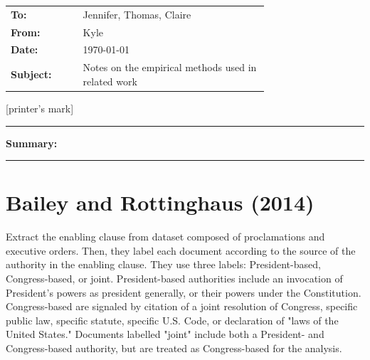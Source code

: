 \documentclass[letterpaper, justified, notitlepage]{tufte-handout}
\theoremstyle{plain}
\newcommand{\memoto}{%
  Jennifer, Thomas, Claire
}
\newcommand{\memofrom}{%
  Kyle
}
\newcommand{\memodate}{\today}
\newcommand{\memosubject}{%
  Notes on the empirical methods used in related work
}
\newcommand{\memosummary}{%
}
\begin{document}
\begin{fullwidth}
  \noindent
  \begin{minipage}[t]{0.62\linewidth}
    \vspace{0pt}
    \begin{tabular}{@{}lp{0.72\linewidth}}
      \textbf{To:}      & \memoto      \\[1pt]
      \textbf{From:}    & \memofrom    \\[1pt]
      \textbf{Date:}    & \memodate    \\[1pt]
      \textbf{Subject:} & \memosubject \\
    \end{tabular}
  \end{minipage}%
  \hfill
  \begin{minipage}[t]{0.22\linewidth}
    \vspace{0pt}
    \raggedleft
    \colorbox{markgray}{%
      \parbox[c][2.2cm][c]{0.95\linewidth}{%
        \centering\color{gray}\footnotesize [printer's mark]
      }%
    }
  \end{minipage}

  \vspace{0.6em}
  \noindent\rule{\linewidth}{0.5pt}
  \vspace{0.6em}

  \noindent\textbf{Summary:}\quad\memosummary

  \vspace{0.8em}
  \noindent\rule{\linewidth}{0.4pt}
  \vspace{1em}
\end{fullwidth}


\section{Bailey and Rottinghaus (2014)}
Extract the enabling clause from dataset composed of proclamations and executive orders. Then,
they label each document according to the source of the authority in the enabling clause. They use 
three labels: President-based, Congress-based, or joint. President-based authorities include an
invocation of President's powers as president generally, or their powers under the Constitution.
Congress-based are signaled by citation of a joint resolution of Congress, specific public law,
specific statute, specific U.S. Code, or declaration of "laws of the United States." Documents
labelled "joint" include both a President- and Congress-based authority, but are treated as
Congress-based for the analysis.
\end{document}
